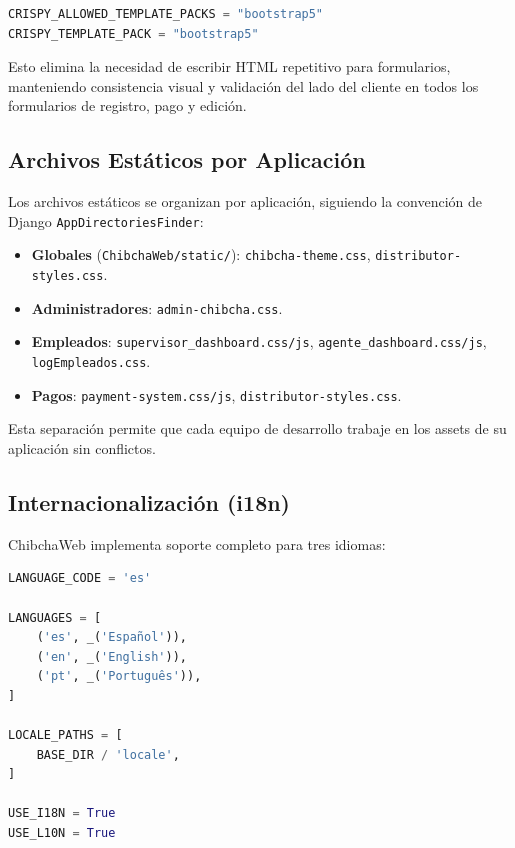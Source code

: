 \documentclass[12pt, a4paper]{article}
\begin{document}
\begin{lstlisting}[language=Python, caption={Configuración de Crispy Forms}]
CRISPY_ALLOWED_TEMPLATE_PACKS = "bootstrap5"
CRISPY_TEMPLATE_PACK = "bootstrap5"
\end{lstlisting}

Esto elimina la necesidad de escribir HTML repetitivo para formularios, manteniendo consistencia visual y validación del lado del cliente en todos los formularios de registro, pago y edición.

\subsection{Archivos Estáticos por Aplicación}

Los archivos estáticos se organizan por aplicación, siguiendo la convención de Django \texttt{AppDirectoriesFinder}:

\begin{itemize}
    \item \textbf{Globales} (\texttt{ChibchaWeb/static/}): \texttt{chibcha-theme.css}, \texttt{distributor-styles.css}.
    \item \textbf{Administradores}: \texttt{admin-chibcha.css}.
    \item \textbf{Empleados}: \texttt{supervisor\_dashboard.css/js}, \texttt{agente\_dashboard.css/js}, \texttt{logEmpleados.css}.
    \item \textbf{Pagos}: \texttt{payment-system.css/js}, \texttt{distributor-styles.css}.
\end{itemize}

Esta separación permite que cada equipo de desarrollo trabaje en los assets de su aplicación sin conflictos.

\subsection{Internacionalización (i18n)}
\label{subsec:i18n}

ChibchaWeb implementa soporte completo para tres idiomas:

\begin{lstlisting}[language=Python, caption={Configuración de idiomas}]
LANGUAGE_CODE = 'es'

LANGUAGES = [
    ('es', _('Español')),
    ('en', _('English')),
    ('pt', _('Português')),
]

LOCALE_PATHS = [
    BASE_DIR / 'locale',
]

USE_I18N = True
USE_L10N = True
\end{lstlisting}
\end{document}
